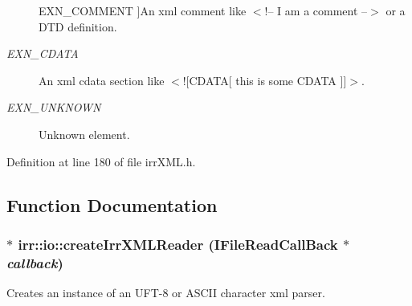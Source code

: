 \begin{Desc}
\begin{description}
{\hypertarget{namespaceirr_1_1io_86a02676c9cbb822e04d60c81b4f33eddc47ef6b25afabf76ff3acea8fea2680}{
EXN\_\-COMMENT}
\label{namespaceirr_1_1io_86a02676c9cbb822e04d60c81b4f33eddc47ef6b25afabf76ff3acea8fea2680}
}]An xml comment like $<$!-- I am a comment --$>$ or a DTD definition. \item[{\em 
\hypertarget{namespaceirr_1_1io_86a02676c9cbb822e04d60c81b4f33edabb26cfe097fadf64c45db0f76523ac6}{
EXN\_\-CDATA}
\label{namespaceirr_1_1io_86a02676c9cbb822e04d60c81b4f33edabb26cfe097fadf64c45db0f76523ac6}
}]An xml cdata section like $<$!\mbox{[}CDATA\mbox{[} this is some CDATA \mbox{]}\mbox{]}$>$. \item[{\em 
\hypertarget{namespaceirr_1_1io_86a02676c9cbb822e04d60c81b4f33edf80bf58165975de0e7a7c28882906865}{
EXN\_\-UNKNOWN}
\label{namespaceirr_1_1io_86a02676c9cbb822e04d60c81b4f33edf80bf58165975de0e7a7c28882906865}
}]Unknown element. \end{description}
\end{Desc}



Definition at line 180 of file irrXML.h.

\subsection{Function Documentation}
\hypertarget{namespaceirr_1_1io_70866610843a6fc753681de9a9076f4d}{
\subsubsection[{createIrrXMLReader}]{ $\ast$ irr::io::createIrrXMLReader (IFileReadCallBack $\ast$ {\em callback})}}
\label{namespaceirr_1_1io_70866610843a6fc753681de9a9076f4d}


Creates an instance of an UFT-8 or ASCII character xml parser. 

